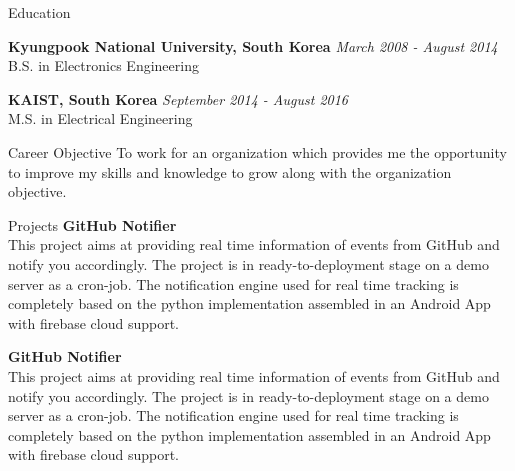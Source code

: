 \documentclass{resume}
\begin{document}
\begin{rSection}{Education}


{\bf Kyungpook National University, South Korea} \hfill {\em March 2008 - August 2014} 
\\ B.S. in Electronics Engineering\hfill 

{\bf KAIST, South Korea} \hfill {\em September 2014 - August 2016} 
\\ M.S. in Electrical Engineering\hfill

\end{rSection}

\begin{rSection}{Career Objective}
 To work for an organization which provides me the opportunity to improve my skills and knowledge to grow along with the organization objective.
\end{rSection}

\begin{rSection}{Projects}
{\bf GitHub Notifier}
\\This project aims at providing real time information of events from GitHub and notify you accordingly. The project is in ready-to-deployment stage on a demo server as a cron-job. The notification engine  used for real time tracking is completely based on the python implementation assembled in an Android App with firebase cloud support.

{\bf GitHub Notifier}
\\This project aims at providing real time information of events from GitHub and notify you accordingly. The project is in ready-to-deployment stage on a demo server as a cron-job. The notification engine  used for real time tracking is completely based on the python implementation assembled in an Android App with firebase cloud support.

\end{rSection}
\end{document}
